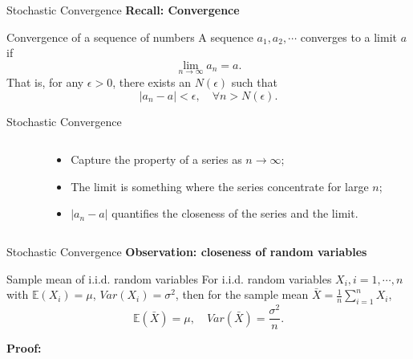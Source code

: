 \documentclass [aspectratio=169]{beamer}
\begin{document}
\begin{frame}{Stochastic Convergence}
    \textbf{Recall: Convergence}
    \begin{block}{Convergence of a sequence of numbers}
    A sequence $a_1, a_2, \cdots$ converges to a limit $a$ if
    $$
    \lim_{n \to \infty} a_n = a.
    $$
That is, for any $\epsilon > 0$, there exists an $N(\epsilon)$ such that
$$
|a_n - a| < \epsilon, \quad \forall n > N(\epsilon).
$$
\end{block}
\end{frame}




\begin{frame}{Stochastic Convergence}
\begin{columns}
\begin{column}{0.5\textwidth}
\end{column}
\begin{column}{0.5\textwidth}
\centering
\begin{itemize}
    \item Capture the property of a series as $n \to \infty$;
    \item The limit is something where the series concentrate for large $n$;
    \item $|a_n - a|$ quantifies the closeness of the series and the limit.
\end{itemize}
\end{column}
\end{columns}
\end{frame}

\begin{frame}{Stochastic Convergence}
    \textbf{Observation: closeness of random variables}\\
    \begin{block}{Sample mean of i.i.d. random variables}
    For i.i.d. random variables $X_i, i = 1, \cdots, n$ with $\mathbb{E}(X_i) = \mu$, $Var(X_i) = \sigma^2$, then for the sample mean $\bar{X} = \frac{1}{n}\sum_{i = 1}^n X_i$, 
    $$
    \mathbb{E}(\bar{X}) = \mu, \quad
    Var(\bar{X}) = \frac{\sigma^2}{n}.
    $$
    \end{block}
    \vspace{0.1in}
    \textbf{Proof:}\\
    \vspace{1in}
\end{frame}
\end{document}
